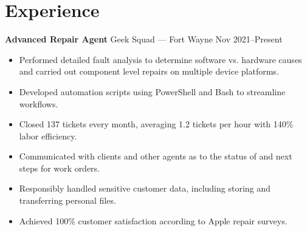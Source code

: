 \documentclass[11pt]{article}
\begin{document}


\section*{Experience}
\textbf{Advanced Repair Agent} \hfill Geek Squad --- Fort Wayne \hfill Nov 2021--Present
\begin{itemize}
	\item Performed detailed fault analysis to determine software vs. hardware causes and carried out component level repairs on multiple device platforms.
	\item Developed automation scripts using PowerShell and Bash to streamline workflows.
	\item Closed 137 tickets every month, averaging 1.2 tickets per hour with 140\% labor efficiency.
	\item Communicated with clients and other agents as to the status of and next steps for work orders.
	\item Responsibly handled sensitive customer data, including storing and transferring personal files.
	\item Achieved 100\% customer satisfaction according to Apple repair surveys.
\end{itemize}
\end{document}
